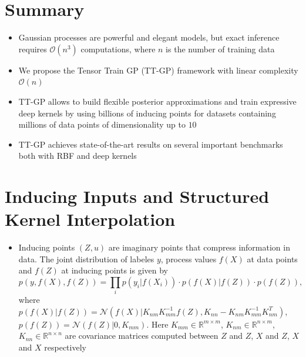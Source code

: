 \documentclass[a0,portrait]{a0poster}
\newcommand{\Knn}{K_{nn}}
\newcommand{\Knm}{K_{nm}}
\newcommand{\Kmm}{K_{mm}}
\newcommand{\R}{\mathbb{R}}
\newcommand{\N}{\mathcal{N}}
\newcommand{\bigO}{\mathcal{O}}
\begin{document}
\begin{multicols}{2} %


%

\section*{\LARGE \color{NavyBlue}Summary}

\begin{itemize}
  \item Gaussian processes are powerful and elegant models, but exact inference 
    requires $\bigO(n^3)$ computations, where $n$ is the number of training data
  \item We propose the Tensor Train GP (TT-GP) framework with 
    linear complexity  $\bigO(n)$ 
  \item TT-GP allows to build flexible posterior approximations and train
    expressive deep kernels by using billions of inducing points for datasets
    containing millions of data points of dimensionality up to $10$
  \item TT-GP achieves state-of-the-art results on several important benchmarks
    both with RBF and deep kernels
\end{itemize}

\section*{\LARGE \color{NavyBlue}Inducing Inputs and Structured Kernel Interpolation}

\begin{itemize}
  \item Inducing points $(Z, u)$ are imaginary points that compress information in data.
    The joint distribution of labeles $y$, process values $f(X)$ at data points
    and $f(Z)$ at inducing points is given by
    \[
      p(y, f(X), f(Z)) = \prod_i p(y_i \vert f(X_i))\cdot p(f(X) \vert f(Z))\cdot p(f(Z)),
    \]
    where 
    $p(f(X) | f(Z)) = \N(f(X) | \Knm \Kmm^{-1} f(Z), \Knn - \Knm \Kmm^{-1} \Knm^T)$,
    $p(f(Z))= \N(f(Z) | 0, \Kmm)$. 
    Here $K_{mm} \in \R^{m \times m}$,
    $K_{nm} \in \R^{n \times m}$,
    $K_{nn} \in \R^{n \times n}$ are covariance matrices computed between $Z$ and $Z$,
    $X$ and $Z$, $X$ and $X$ respectively
  

\end{itemize}
\end{multicols}
\end{document}
